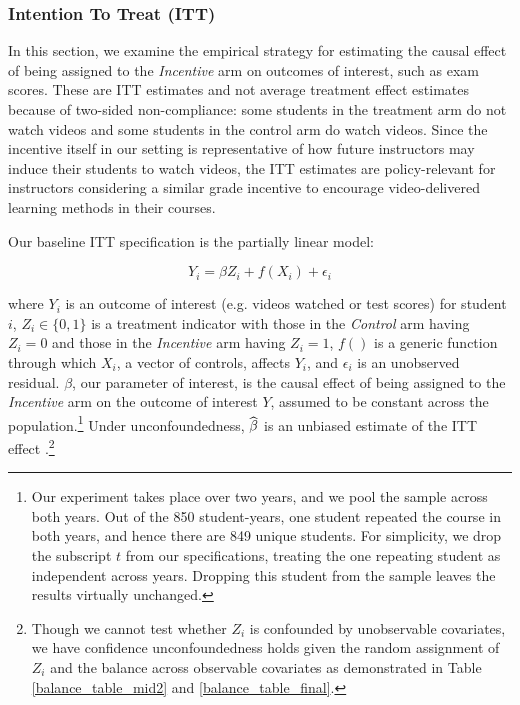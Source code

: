 \documentclass[12pt]{article}
\newcommand\wh[1]{\hstretch{2}{\hat{\hstretch{.5}{#1}}}}
\begin{document}
\subsubsection{Intention To Treat (ITT)}

In this section, we examine the empirical strategy for estimating the causal effect of being assigned to the \textit{Incentive} arm on outcomes of interest, such as exam scores. These are ITT estimates and not average treatment effect estimates because of two-sided non-compliance: some students in the treatment arm do not watch videos and some students in the control arm do watch videos. Since the incentive itself in our setting is representative of how future instructors may induce their students to watch videos, the ITT estimates are policy-relevant for instructors considering a similar grade incentive to encourage video-delivered learning methods in their courses.

Our baseline ITT specification is the partially linear model:

\begin{equation} \label{itt_spec}
	Y_i = \beta Z_i + f(X_i) + \epsilon_i
\end{equation}

where $Y_i$ is an outcome of interest (e.g. videos watched or test scores) for student $i$, $Z_i \in \{0,1\}$ is a treatment indicator with those in the \textit{Control} arm having $Z_i=0$ and those in the \textit{Incentive} arm having $Z_i=1$, $f()$ is a generic function through which $X_i$, a vector of controls, affects $Y_i$, and $\epsilon_i$ is an unobserved residual. $\beta$, our parameter of interest, is the causal effect of being assigned to the \textit{Incentive} arm on the outcome of interest $Y$, assumed to be constant across the population.\footnote{Our experiment takes place over two years, and we pool the sample across both years. Out of the 850 student-years, one student repeated the course in both years, and hence there are 849 unique students. For simplicity, we drop the subscript $t$ from our specifications, treating the one repeating student as independent across years. Dropping this student from the sample leaves the results virtually unchanged.} Under unconfoundedness, $\wh{\beta}$ is an unbiased estimate of the ITT effect \parencite{ir2015}.\footnote{Though we cannot test whether $Z_i$ is confounded by unobservable covariates, we have confidence unconfoundedness holds given the random assignment of $Z_i$ and the balance across observable covariates as demonstrated in Table \ref{balance_table_mid2} and \ref{balance_table_final}.}
\end{document}
